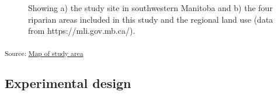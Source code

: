\documentclass[
]{agujournal2019}
\begin{document}
\begin{figure}[H]


\caption{\label{fig-map}Showing a) the study site in southwestern
Manitoba and b) the four riparian areas included in this study and the
regional land use (data from https://mli.gov.mb.ca/).}

\end{figure}%

\textsubscript{Source:
\href{https://alex-koiter.github.io/riparian-grazing-manuscript/notebooks/05_Map-preview.html\#cell-fig-map}{Map
of study area}}

\subsection{Experimental design}\label{experimental-design}
\end{document}
